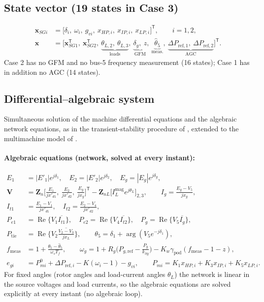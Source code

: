 \documentclass[11pt,a4paper]{article}
\numberwithin{equation}{section}
\newcommand{\cj}[1]{\overline{#1}}
\newcommand{\re}{\operatorname{Re}}
\begin{document}
\subsection{State vector (19 states in Case 3)}
\begin{align}
\bm x_{SGi} &= \big[\delta_i,\ \omega_i,\ g_{vi},\ x_{HP,i},\ x_{IP,i},\ x_{LP,i}\big]^{\mathsf T},\qquad i=1,2,\\
\bm x &= \big[\bm x_{SG1}^{\mathsf T},\ \bm x_{SG2}^{\mathsf T},\ \underbrace{\theta_{L,2},\ \theta_{L,3}}_{\text{loads}},\ \underbrace{\delta_g,\ z}_{\text{GFM}},\ \underbrace{\hat\theta_5}_{\text{meas.}},\ \underbrace{\Delta P_{\text{ref},1},\ \Delta P_{\text{ref},2}}_{\text{AGC}}\big]^{\mathsf T}.
\end{align}
Case 2 has no GFM and no bus-5 frequency measurement (16 states); Case 1 has in addition no AGC (14 states).

\subsection{Differential--algebraic system}
Simultaneous solution of the machine differential equations and the algebraic network equations, as in the transient-stability procedure of \cite{KothariNagrath2011}, extended to the multimachine model of \cite{SauerPai1998}.
\paragraph{Algebraic equations (network, solved at every instant):}
\begin{align}
E_1 &= |E'_1|e^{j\delta_1},\quad E_2 = |E'_2|e^{j\delta_2},\quad E_g = |E_g|e^{j\delta_g},\\
\bm V &= \bm Z_n\Big[\tfrac{E_1}{jx'_{d1}},\ \tfrac{E_2}{jx'_{d2}},\ \tfrac{E_g}{jx_g}\Big]^{\mathsf T} - \bm Z_{nL}\big[I_L^{\text{mag}}e^{j\theta_{L}}\big]_{2,3},\qquad
I_g = \frac{E_g - V_5}{jx_g},\\
I_{t1} &= \tfrac{E_1-V_1}{jx'_{d1}},\quad I_{t2} = \tfrac{E_2-V_4}{jx'_{d2}},\\
P_{e1} &= \re\{V_1\cj{I_{t1}}\},\quad
P_{e2} = \re\{V_4\cj{I_{t2}}\},\quad
P_g = \re\{V_5\cj{I_g}\},\\
P_{\text{tie}} &= \re\Big\{V_2\cj{\tfrac{V_2-V_3}{jx_L}}\Big\},\qquad
\theta_5 = \delta_1 + \arg(V_5e^{-j\delta_1}),\\
f_{\text{meas}} &= 1 + \frac{\theta_5-\hat\theta_5}{\omega_sT_f},\qquad
\omega_g = 1 + R_g\Big(P_{g,\text{ref}} - \tfrac{P_g}{k_{Sg}}\Big) - K_w\gamma_{\text{pod}}(f_{\text{meas}}-1-z),\\
e_{gi} &= P_{mi}^0 + \Delta P_{\text{ref},i} - K(\omega_i-1) - g_{vi},\qquad
P_{mi} = K_1x_{HP,i}+K_3x_{IP,i}+K_5x_{LP,i}.
\end{align}
For fixed angles (rotor angles and load-current angles $\theta_L$) the network is linear in the source voltages and load currents, so the algebraic equations are solved explicitly at every instant (no algebraic loop).
\end{document}
